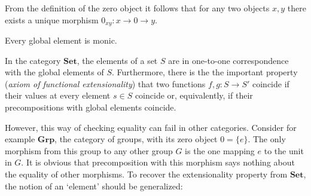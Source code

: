     \begin{property}
        From the definition of the zero object it follows that for any two objects $x,y$ there exists a unique morphism $0_{xy}:x\rightarrow0\rightarrow y$.
    \end{property}

    \begin{property}
        Every global element is monic.
    \end{property}


    \begin{remark}\label{cat:global_elements_remark}
        In the category $\mathbf{Set}$, the elements of a set $S$ are in one-to-one correspondence with the global elements of $S$. Furthermore, there is the the important property (\textit{axiom of functional extensionality}) that two functions $f,g:S\rightarrow S'$ coincide if their values at every element $s\in S$ coincide or, equivalently, if their precompositions with global elements coincide.

        However, this way of checking equality can fail in other categories. Consider for example $\mathbf{Grp}$, the category of groups, with its zero object $0=\{e\}$. The only morphism from this group to any other group $G$ is the one mapping $e$ to the unit in $G$. It is obvious that precomposition with this morphism says nothing about the equality of other morphisms. To recover the extensionality property from $\mathbf{Set}$, the notion of an `element' should be generalized:
    \end{remark}

